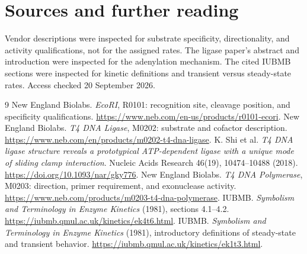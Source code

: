 \chapter*{Sources and further reading}
Vendor descriptions were inspected for substrate specificity, directionality, and activity qualifications, not for the assigned rates. The ligase paper's abstract and introduction were inspected for the adenylation mechanism. The cited IUBMB sections were inspected for kinetic definitions and transient versus steady-state rates. Access checked 20 September 2026.

\begingroup\let\chapter\section
\begin{thebibliography}{9}
 New England Biolabs. \emph{EcoRI}, R0101: recognition site, cleavage position, and specificity qualifications.
\url{https://www.neb.com/en-us/products/r0101-ecori}.
 New England Biolabs. \emph{T4 DNA Ligase}, M0202: substrate and cofactor description.
\url{https://www.neb.com/en/products/m0202-t4-dna-ligase}.
 K. Shi et al. \emph{T4 DNA ligase structure reveals a prototypical ATP-dependent ligase with a unique mode of sliding clamp interaction}. Nucleic Acids Research 46(19), 10474--10488 (2018).
\url{https://doi.org/10.1093/nar/gky776}.
 New England Biolabs. \emph{T4 DNA Polymerase}, M0203: direction, primer requirement, and exonuclease activity.
\url{https://www.neb.com/products/m0203-t4-dna-polymerase}.
 IUBMB. \emph{Symbolism and Terminology in Enzyme Kinetics} (1981), sections 4.1--4.2.
\url{https://iubmb.qmul.ac.uk/kinetics/ek4t6.html}.
 IUBMB. \emph{Symbolism and Terminology in Enzyme Kinetics} (1981), introductory definitions of steady-state and transient behavior.
\url{https://iubmb.qmul.ac.uk/kinetics/ek1t3.html}.
\end{thebibliography}
\endgroup
